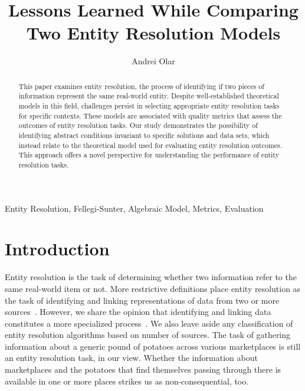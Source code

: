 \documentclass[journal]{IEEEtran}
\begin{document}
    \title{Lessons Learned While Comparing Two Entity Resolution Models}
    \author{Andrei Olar}

    \maketitle

    \theoremstyle{definition}
    \newtheorem{defn}{Definition}[section]
    
    \maketitle
    \begin{abstract}
        This paper examines entity resolution, the process of identifying if two
        pieces of information represent the same real-world entity.
        Despite well-established theoretical models in this field, challenges
        persist in selecting appropriate entity resolution tasks for specific
        contexts.
        These models are associated with quality metrics that assess the
        outcomes of entity resolution tasks.
        Our study demonstrates the possibility of identifying abstract
        conditions invariant to specific solutions and data sets, which instead
        relate to the theoretical model used for evaluating entity resolution
        outcomes.
        This approach offers a novel perspective for understanding the
        performance of entity resolution tasks.
    \end{abstract}

    \begin{IEEEkeywords}
        Entity Resolution, Fellegi-Sunter, Algebraic Model, Metrics, Evaluation
    \end{IEEEkeywords}

    \section{Introduction}\label{sec:introduction}
    Entity resolution is the task of determining whether two information refer
    to the same real-world item or not.
    More restrictive definitions place entity resolution as the task of
    identifying and linking representations of data from two or more
    sources~\cite{Qia17}.
    However, we share the opinion that identifying and linking data constitutes
    a more specialized process~\cite{Tal11}.
    We also leave aside any classification of entity resolution algorithms based
    on number of sources.
    The task of gathering information about a generic pound of potatoes across
    various marketplaces is still an entity resolution task, in our view.
    Whether the information about marketplaces and the potatoes that find
    themselves passing through there is available in one or more places strikes
    us as non-consequential, too.
    
\end{document}
